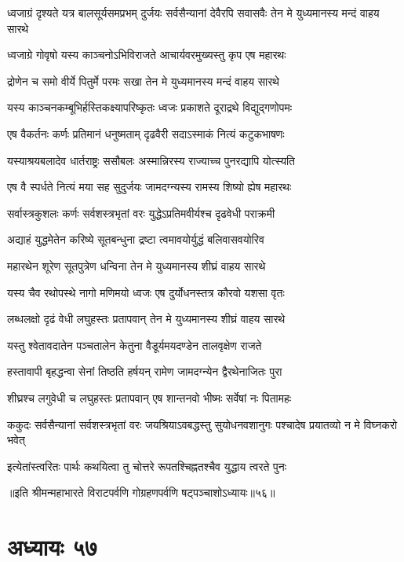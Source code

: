 \threelineshloka
{ध्वजाग्रं दृश्यते यत्र बालसूर्यसमप्रभम्}
{दुर्जयः सर्वसैन्यानां देवैरपि सवासवैः}
{तेन मे युध्यमानस्य मन्दं वाहय सारथे}


\twolineshloka
{ध्वजाग्रे गोवृषो यस्य काञ्चनोऽभिविराजते}
{आचार्यवरमुख्यस्तु कृप एष महारथः}


\twolineshloka
{द्रोणेन च समो वीर्ये पितुर्मे परमः सखा}
{तेन मे युध्यमानस्य मन्दं वाहय सारथे}


\twolineshloka
{यस्य काञ्चनकम्बूभिर्हस्तिकक्ष्यापरिष्कृतः}
{ध्वजः प्रकाशते दूराद्रथे विद्युद्गणोपमः}


\twolineshloka
{एष वैकर्तनः कर्णः प्रतिमानं धनुष्मताम्}
{दृढवैरी सदाऽस्माकं नित्यं कटुकभाषणः}


\twolineshloka
{यस्याश्रयबलादेव धार्तराष्ट्रः ससौबलः}
{अस्मान्निरस्य राज्याच्च पुनरद्यापि योत्स्यति}


\twolineshloka
{एष वै स्पर्धते नित्यं मया सह सुदुर्जयः}
{जामदग्न्यस्य रामस्य शिष्यो ह्येष महारथः}


\twolineshloka
{सर्वास्त्रकुशलः कर्णः सर्वशस्त्रभृतां वरः}
{युद्धेऽप्रतिमवीर्यश्च दृढवेधी पराक्रमी}


\twolineshloka
{अद्याहं युद्धमेतेन करिष्ये सूतबन्धुना}
{द्रष्टा त्वमावयोर्युद्धं बलिवासवयोरिव}


\twolineshloka
{महारथेन शूरेण सूतपुत्रेण धन्विना}
{तेन मे युध्यमानस्य शीघ्रं वाहय सारथे}


\twolineshloka
{यस्य चैव रथोपस्थे नागो मणिमयो ध्वजः}
{एष दुर्योधनस्तत्र कौरवो यशसा वृतः}


\twolineshloka
{लब्धलक्षो दृढं वेधी लघुहस्तः प्रतापवान्}
{तेन मे युध्यमानस्य शीघ्रं वाहय सारथे}


\twolineshloka
{यस्तु श्वेतावदातेन पञ्चतालेन केतुना}
{वैडूर्यमयदण्डेन तालवृक्षेण राजते}


\twolineshloka
{हस्तावापी बृहद्धन्वा सेनां तिष्ठति हर्षयन्}
{रामेण जामदग्न्येन द्वैरथेनाजितः पुरा}


\twolineshloka
{शीघ्रश्च लगुवेधी च लघुहस्तः प्रतापवान्}
{एष शान्तनवो भीष्मः सर्वेषां नः पितामहः}


\threelineshloka
{ककुदः सर्वसैन्यानां सर्वशस्त्रभृतां वरः}
{जयश्रियाऽवबद्धस्तु सुयोधनवशानुगः}
{पश्चादेष प्रयातव्यो न मे विघ्नकरो भवेत्}


\twolineshloka
{इत्येतांस्त्वरितः पार्थः कथयित्वा तु चोत्तरे}
{रूपतश्चिह्नतश्चैव युद्धाय त्वरते पुनः}

॥इति श्रीमन्महाभारते विराटपर्वणि गोग्रहणपर्वणि षट्पञ्चाशोऽध्यायः॥५६॥

\chapter{अध्यायः ५७}

